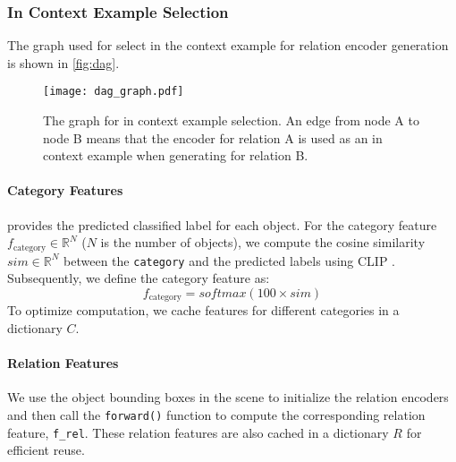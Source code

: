 \subsubsection{In Context Example Selection}
The graph used for select in the context example for relation encoder generation is shown in \autoref{fig:dag}. 


\begin{figure*}
    \centering
    \texttt{[image: dag\_graph.pdf]}
    \caption{The graph for in context example selection. An edge from node A to node B means that the encoder for relation A is used as an in context example when generating for relation B.}
    \label{fig:dag}
\end{figure*}

\paragraph{Category Features}
\cite{yuan2024visual} provides the predicted classified label for each object. For the category feature $f_{\text{category}} \in \mathbb{R}^{N}$ ($N$ is the number of objects), we compute the cosine similarity $sim \in \mathbb{R}^{N}$ between the \texttt{category} and the predicted labels using CLIP \citep{radford2021learning}.
Subsequently, we define the category feature as:
$$
f_{\text{category}} = softmax(100 \times sim)
$$
To optimize computation, we cache features for different categories in a dictionary $C$.
\vspace{-0.3cm}


\paragraph{Relation Features}
We use the object bounding boxes in the scene to initialize the relation encoders and then call the \texttt{forward()} function to compute the corresponding relation feature, \texttt{f\_rel}. These relation features are also cached in a dictionary $R$ for efficient reuse.

